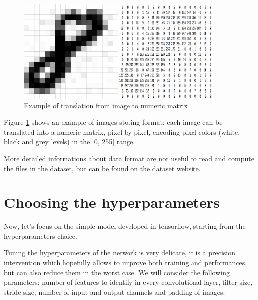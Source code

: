 \begin{figure}
	\centering
	\includegraphics[width=0.9\textwidth]{Images/image_to_matrix}
	\caption{Example of translation from image to numeric matrix}
	\label{fig:image_to_matrix}
\end{figure}

Figure \ref{fig:image_to_matrix} shows an example of images storing format: each image can be translated into a numeric matrix, pixel by pixel, encoding pixel colors (white, black and grey levels) in the [0, 255] range.

More detailed informations about data format are not useful to read and compute the files in the dataset, but can be found on the \href{http://yann.lecun.com/exdb/mnist/}{dataset website}.

\section{Choosing the hyperparameters}

Now, let's focus on the simple model developed in tensorflow, starting from the hyperparameters choice.

Tuning the hyperparameters of the network is very delicate, it is a precision intervention which hopefully allows to improve both training and performances, but can also reduce them in the worst case. We will consider the following parameters: number of features to identify in every convolutional layer, filter size, stride size, number of input and output channels and padding of images.


